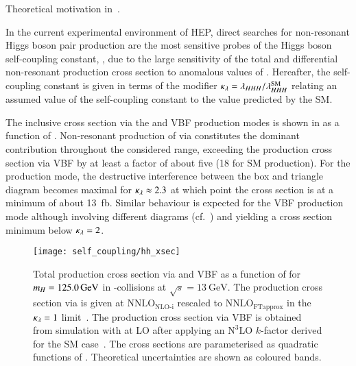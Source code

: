Theoretical motivation in~.

In the current experimental environment of HEP, direct searches for
non-resonant Higgs boson pair production are the most sensitive probes
of the Higgs boson self-coupling constant, \lambdahhh, due to the
large sensitivity of the total and differential non-resonant \HH
production cross section to anomalous values of \lambdahhh. Hereafter,
the self-coupling constant is given in terms of the modifier
$\kappa_{\lambda} = \lambda_{HHH} / \lambda_{HHH}^{\text{SM}}$ relating an assumed
value of the self-coupling constant to the value predicted by the SM.

The inclusive \HH cross section via the \ggF and VBF production modes
is shown in  as a function of
\klambda. Non-resonant production of \HH via \ggF constitutes the
dominant contribution throughout the considered \klambda range,
exceeding the production cross section via VBF by at least a factor of
about five (18 for SM \HH production). For the \ggF production mode,
the destructive interference between the box and triangle diagram
becomes maximal for $\kappa_{\lambda} \approx 2.3$ at which point the cross
section is at a minimum of about \SI{13}{\femto\barn}. Similar
behaviour is expected for the VBF production mode although involving
different diagrams (cf.\ ) and yielding a cross
section minimum below $\kappa_{\lambda} = 2$.

\begin{figure}[htbp]
  \centering

  \texttt{[image: self\_coupling/hh\_xsec]}

  \caption{Total \HH production cross section via \ggF and VBF as a
    function of \klambda for $m_{H} = \SI{125.0}{\ensuremath{\text{GeV}}}$ in
    \pp-collisions at $\sqrt{s} = \SI{13}{\GeV}$. The production cross
    section via \ggF is given at $\text{NNLO}_{\text{NLO-i}}$ rescaled
    to $\text{NNLO}_{\text{FTapprox}}$ in the $\kappa_{\lambda} = 1$
    limit~\cite{Amoroso:2020lgh,Baglio:2020wgt,LHCHWGHH,Grazzini:2018bsd}. The
    production cross section via VBF is obtained from simulation with
    \MGNLO at LO after applying an $\text{N}^3\text{LO}$ $k$-factor
    derived for the SM case~\cite{Dreyer:2018qbw,LHCHWGHH}. The cross
    sections are parameterised as quadratic functions of
    \klambda. Theoretical uncertainties are shown as coloured bands.}%
  \label{fig:hh_xsec_incl}
\end{figure}

